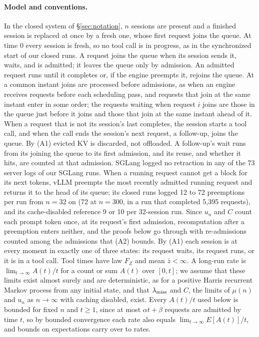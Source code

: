 \paragraph{Model and conventions.} In the closed system of \S\ref{sec:notation}, $n$ sessions are present and a finished session is replaced at once by a fresh one, whose first request joins the queue. At time 0 every session is fresh, so no tool call is in progress, as in the synchronized start of our closed runs. A request joins the queue when its session sends it, waits, and is admitted; it leaves the queue only by admission. An admitted request runs until it completes or, if the engine preempts it, rejoins the queue. At a common instant joins are processed before admissions, as when an engine receives requests before each scheduling pass, and requests that join at the same instant enter in some order; the requests waiting when request $i$ joins are those in the queue just before it joins and those that join at the same instant ahead of it. When a request that is not its session's last completes, the session starts a tool call, and when the call ends the session's next request, a follow-up, joins the queue. By (A1) evicted KV is discarded, not offloaded. A follow-up's wait runs from its joining the queue to its first admission, and its reuse, and whether it hits, are counted at that admission. SGLang logged no retraction in any of the 73 server logs of our SGLang runs. When a running request cannot get a block for its next tokens, vLLM preempts the most recently admitted running request and returns it to the head of its queue; its closed runs logged 12 to 72 preemptions per run from $n=32$ on (72 at $n=300$, in a run that completed 5,395 requests), and its cache-disabled reference 9 or 10 per 32-session run. Since $u_n$ and $C$ count each prompt token once, at its request's first admission, recomputation after a preemption enters neither, and the proofs below go through with re-admissions counted among the admissions that (A2) bounds. By (A1) each session is at every moment in exactly one of three states: its request waits, its request runs, or it is in a tool call. Tool times have law $F_Z$ and mean $\bar z<\infty$. A long-run rate is $\lim_{t\to\infty}A(t)/t$ for a count or sum $A(t)$ over $[0,t]$; we assume that these limits exist almost surely and are deterministic, as for a positive Harris recurrent Markov process from any initial state, and that $\lambda_{\mathrm{miss}}$ and $C$, the limits of $\mu(n)$ and $u_n$ as $n\to\infty$ with caching disabled, exist. Every $A(t)/t$ used below is bounded for fixed $n$ and $t\ge1$, since at most $\alpha t+\beta$ requests are admitted by time $t$, so by bounded convergence each rate also equals $\lim_{t\to\infty}E[A(t)]/t$, and bounds on expectations carry over to rates.

